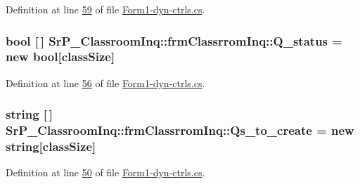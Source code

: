 \-Definition at line \hyperlink{_form1-dyn-ctrls_8cs_source_l00059}{59} of file \hyperlink{_form1-dyn-ctrls_8cs_source}{\-Form1-\/dyn-\/ctrls.\-cs}.

\hypertarget{class_sr_p___classroom_inq_1_1frm_classrrom_inq_ae02a7c8f440963717ee0cf2f74d4d56a}{
\subsubsection[{\-Q\-\_\-status}]{\setlength{\rightskip}{0pt plus 5cm}bool \mbox{[}$\,$\mbox{]} {\bf \-Sr\-P\-\_\-\-Classroom\-Inq\-::frm\-Classrrom\-Inq\-::\-Q\-\_\-status} = new bool\mbox{[}{\bf class\-Size}\mbox{]}}}
\label{class_sr_p___classroom_inq_1_1frm_classrrom_inq_ae02a7c8f440963717ee0cf2f74d4d56a}


\-Definition at line \hyperlink{_form1-dyn-ctrls_8cs_source_l00056}{56} of file \hyperlink{_form1-dyn-ctrls_8cs_source}{\-Form1-\/dyn-\/ctrls.\-cs}.

\hypertarget{class_sr_p___classroom_inq_1_1frm_classrrom_inq_a04ea330233515e3af7d23fcd501364cc}{
\subsubsection[{\-Qs\-\_\-to\-\_\-create}]{\setlength{\rightskip}{0pt plus 5cm}string \mbox{[}$\,$\mbox{]} {\bf \-Sr\-P\-\_\-\-Classroom\-Inq\-::frm\-Classrrom\-Inq\-::\-Qs\-\_\-to\-\_\-create} = new string\mbox{[}{\bf class\-Size}\mbox{]}}}
\label{class_sr_p___classroom_inq_1_1frm_classrrom_inq_a04ea330233515e3af7d23fcd501364cc}


\-Definition at line \hyperlink{_form1-dyn-ctrls_8cs_source_l00050}{50} of file \hyperlink{_form1-dyn-ctrls_8cs_source}{\-Form1-\/dyn-\/ctrls.\-cs}.

